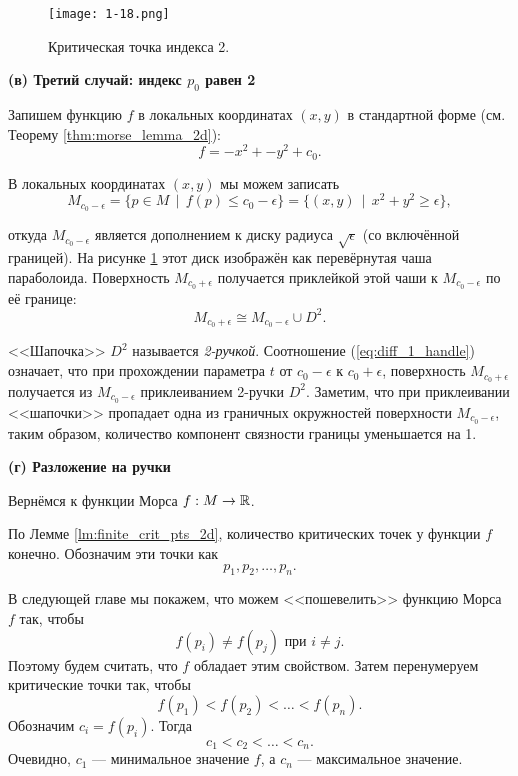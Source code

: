 \documentclass[a4paper,12pt,openany,leqno]{extbook}
\begin{document}
\begin{figure}[ht]
\texttt{[image: 1-18.png]}
\caption{Критическая точка индекса 2.}
\label{fig:p0_index_two}
\end{figure}

\textbf{(в) Третий случай: индекс $p_0$ равен 2}

Запишем функцию $f$ в локальных координатах $(x, y)$ в стандартной форме (см. Теорему \ref{thm:morse_lemma_2d}):
\begin{equation}
f = -x^2 + -y^2 + c_0.
\end{equation}

В локальных координатах $(x, y)$ мы можем записать
\begin{equation}
M_{c_0 - \epsilon} = \{p \in M\,\mid\,f(p) \leq c_0 - \epsilon\} = \{(x, y)\,\mid\,x^2 + y^2 \geq \epsilon\},
\end{equation}

откуда $M_{c_0 - \epsilon}$ является дополнением к диску радиуса $\sqrt{\epsilon}$ (со включённой границей). На рисунке \ref{fig:p0_index_two} этот диск изображён как перевёрнутая чаша параболоида. Поверхность $M_{c_0 + \epsilon}$ получается приклейкой этой чаши к $M_{c_0 - \epsilon}$ по её границе:
\begin{equation}
M_{c_0 + \epsilon} \cong M_{c_0 - \epsilon} \cup D^2.
\label{eq:diff_2_handle}
\end{equation}

<<Шапочка>> $D^2$ называется \emph{2-ручкой}. Соотношение (\ref{eq:diff_1_handle}) означает, что при прохождении параметра $t$ от $c_0 - \epsilon$ к $c_0 + \epsilon$, поверхность $M_{c_0 + \epsilon}$ получается из $M_{c_0 - \epsilon}$ приклеиванием 2-ручки $D^2$. Заметим, что при приклеивании <<шапочки>> пропадает одна из граничных окружностей поверхности $M_{c_0 - \epsilon}$, таким образом, количество компонент связности границы уменьшается на 1.

\textbf{(г) Разложение на ручки}

Вернёмся к функции Морса $f: M \to \mathbb{R}$.

По Лемме \ref{lm:finite_crit_pts_2d}, количество критических точек у функции $f$ конечно. Обозначим эти точки как
\[p_1, p_2, \ldots, p_n.\]

В следующей главе мы покажем, что можем <<пошевелить>> функцию Морса $f$ так, чтобы
\[f(p_i) \neq f(p_j) \text{ при } i \neq j.\]
Поэтому будем считать, что $f$ обладает этим свойством. Затем перенумеруем критические точки так, чтобы
\begin{equation}
f(p_1) < f(p_2) < \ldots < f(p_n).
\end{equation}
Обозначим $c_i = f(p_i)$. Тогда
\begin{equation}
c_1 < c_2 < \ldots < c_n.
\end{equation}
Очевидно, $c_1$ --- минимальное значение $f$, а $c_n$ --- максимальное значение.
\end{document}
